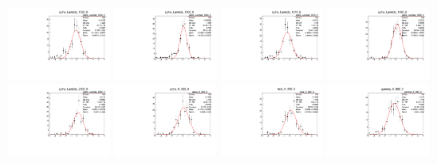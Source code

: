 \begin{figure}[h]
    \includegraphics[width=0.24\textwidth]{figure/io_full_sim/alpha/pull_alpha_Lambda_1520_0.pdf}
    \includegraphics[width=0.24\textwidth]{figure/io_full_sim/alpha/pull_alpha_Lambda_1600_0.pdf}
    \includegraphics[width=0.24\textwidth]{figure/io_full_sim/alpha/pull_alpha_Lambda_1670_0.pdf}
    \includegraphics[width=0.24\textwidth]{figure/io_full_sim/alpha/pull_alpha_Lambda_1690_0.pdf}
    \includegraphics[width=0.24\textwidth]{figure/io_full_sim/alpha/pull_alpha_Lambda_2000_0.pdf}
    \includegraphics[width=0.24\textwidth]{figure/io_full_sim/alpha/pull_alpha_alpha_K_892_0.pdf}
    \includegraphics[width=0.24\textwidth]{figure/io_full_sim/alpha/pull_alpha_beta_K_892_0.pdf}
    \includegraphics[width=0.24\textwidth]{figure/io_full_sim/alpha/pull_alpha_gamma_K_892_0.pdf}

\end{figure}
